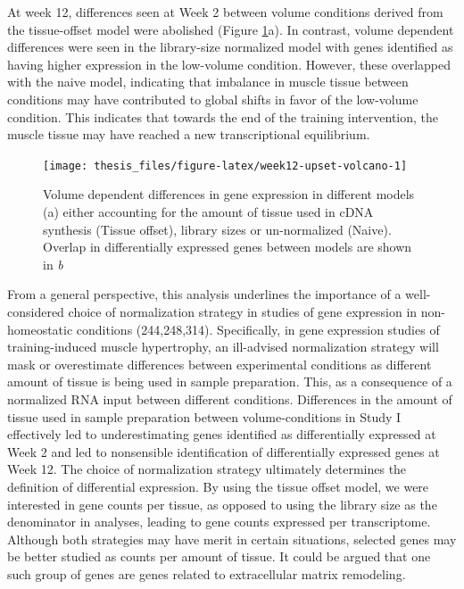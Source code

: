 \documentclass[twoside,10pt]{gihclass} %
\begin{document}
At week 12, differences seen at Week 2 between volume conditions derived from the tissue-offset model were abolished (Figure \ref{fig:week12-upset-volcano}a). In contrast, volume dependent differences were seen in the library-size normalized model with genes identified as having higher expression in the low-volume condition. However, these overlapped with the naive model, indicating that imbalance in muscle tissue between conditions may have contributed to global shifts in favor of the low-volume condition. This indicates that towards the end of the training intervention, the muscle tissue may have reached a new transcriptional equilibrium.
\begin{figure}

{\centering \texttt{[image: thesis\_files/figure-latex/week12-upset-volcano-1]} 

}

\caption[General patterns of differentially expressed genes at Week 12]{Volume dependent differences in gene expression in different models (a) either accounting for the amount of tissue used in cDNA synthesis (Tissue offset), library sizes or un-normalized (Naive). Overlap in differentially expressed genes between models are shown in \textit{b}}\label{fig:week12-upset-volcano}
\end{figure}
From a general perspective, this analysis underlines the importance of a well-considered choice of normalization strategy in studies of gene expression in non-homeostatic conditions
(244,248,314).
Specifically, in gene expression studies of training-induced muscle hypertrophy, an ill-advised normalization strategy will mask or overestimate differences between experimental conditions as different amount of tissue is being used in sample preparation. This, as a consequence of a normalized RNA input between different conditions. Differences in the amount of tissue used in sample preparation between volume-conditions in Study I effectively led to underestimating genes identified as differentially expressed at Week 2 and led to nonsensible identification of differentially expressed genes at Week 12.
The choice of normalization strategy ultimately determines the definition of differential expression. By using the tissue offset model, we were interested in gene counts per tissue, as opposed to using the library size as the denominator in analyses, leading to gene counts expressed per transcriptome. Although both strategies may have merit in certain situations, selected genes may be better studied as counts per amount of tissue. It could be argued that one such group of genes are genes related to extracellular matrix remodeling.
\end{document}
